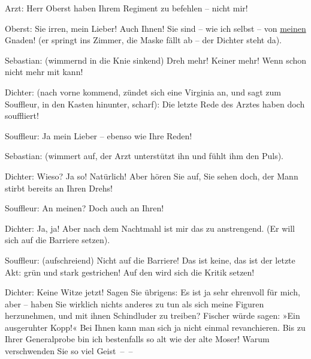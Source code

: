 \pstart
           Arzt: Herr Oberst haben Ihrem Regiment zu befehlen – nicht mir!\pend
           
\pstart
           Oberst: Sie irren, mein Lieber! Auch Ihnen! Sie sind – wie ich selbst – von \uline{meinen} Gnaden! (er springt ins Zimmer, die Maske fällt
               ab – der Dichter steht da).\pend
           
\pstart
           Sebastian: (wimmernd in die Knie sinkend)  Dreh mehr!
               Keiner mehr! Wenn  schon nicht mehr mit kann!\pend
           
\pstart
           Dichter: (nach vorne kommend, zündet sich eine Virginia an, und sagt zum Souffleur,
               in den Kasten hinunter, scharf): {\pb}Die letzte Rede des Arztes haben doch 
               souffliert!\pend
           
\pstart
           Souffleur: Ja mein Lieber – ebenso wie Ihre Reden!\pend
           
\pstart
           Sebastian: (wimmert auf, der Arzt unterstützt ihn und fühlt ihm den Puls).\pend
           
\pstart
           Dichter: Wieso? Ja so! Natürlich! Aber hören Sie auf, Sie sehen doch, der Mann stirbt
               bereits an Ihren Drehs!\pend
           
\pstart
           Souffleur: An meinen? Doch auch an Ihren!\pend
           
\pstart
           Dichter: Ja, ja! Aber nach dem Nachtmahl ist mir das zu anstrengend. (Er will sich
               auf die Barriere setzen).\pend
           
\pstart
           Souffleur: (aufschreiend) Nicht auf die Barriere! Das ist keine, das ist der letzte
               Akt: grün und stark gestrichen! Auf den wird sich die Kritik setzen!\pend
           
\pstart
           Dichter: Keine Witze jetzt! Sagen Sie übrigens: Es ist ja sehr ehrenvoll für mich,
               aber – haben Sie wirklich nichts anderes zu tun als sich meine Figuren herzunehmen,
               und mit ihnen Schindluder zu treiben? Fischer
               würde sagen: »Ein ausgeruhter Kopp!« Bei Ihnen kann man sich ja nicht einmal
               revanchieren. Bis zu Ihrer Generalprobe bin ich bestenfalls so alt wie der alte
               Moser! Warum verschwenden Sie so viel Geist – –\pend
           
